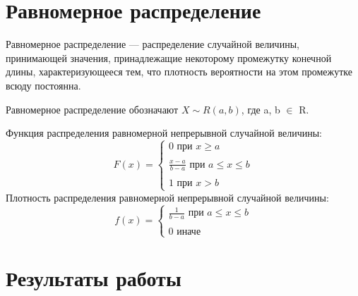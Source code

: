 \documentclass[12pt,a4paper,oneside]{report}
\begin{document}
\section*{Равномерное распределение}
\quad Равномерное распределение — распределение случайной величины, принимающей значения, принадлежащие некоторому промежутку конечной длины, характеризующееся тем, что плотность вероятности на этом промежутке всюду постоянна.

Равномерное распределение обозначают $X \sim R(a, b)$, где a, b $\in$ R. 

Функция распределения равномерной непрерывной случайной величины:
\begin{equation}
    F(x) = \begin{cases}
            0 \text{ при } x \geq a\\\\
            \frac{x-a}{b-a} \text{ при } a \leq x \leq b\\\\
            1 \text{ при } x > b
    \end{cases}
\end{equation}
Плотность распределения равномерной непрерывной случайной величины:
\begin{equation}
    f(x) = \begin{cases}
            \frac{1}{b-a} \text{ при } a \leq x \leq b\\\\
            0 \text{ иначе }
    \end{cases}
\end{equation}
\clearpage

\section*{Результаты работы}
\end{document}
